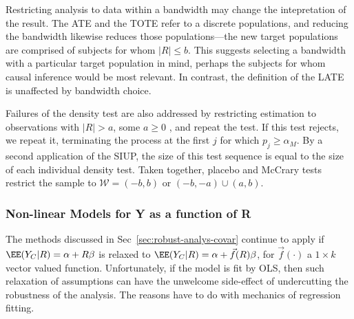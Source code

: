 Restricting analysis to data within a bandwidth may change the
intepretation of the result. The ATE and the
TOTE refer to a discrete populations, and reducing the bandwidth likewise
reduces those populations---the new target populations are comprised of
subjects for whom $|R|\le b$.
This suggests selecting a bandwidth with a particular target
population in mind, perhaps the subjects for whom causal inference
would be most relevant.
In contrast, the definition of the LATE is unaffected by bandwidth
choice.


Failures of the density test are also addressed by restricting
estimation to observations with $|R|>a$, some $a \geq 0$
\citep[e.g.,][]{barrecaetal2011birthweightRDD,eggers2014validity}, and
repeat the test.
If this test rejects, we repeat it, terminating the process at the first $j$ for which
$p_{j} \geq \alpha_{M}$.
By a second application of the SIUP,
the size of this test sequence is equal to the size of each individual
density test.
Taken together, placebo and McCrary tests restrict the sample to
$\mathcal{W} = (-b, b)$ or  $(-b, -a) \cup (a, b)$.

\subsubsection{Non-linear Models for Y as a function of R}\label{sec:nonlinear}
The methods discussed in Sec~\ref{sec:robust-analys-covar} continue to
apply if $\EE (Y_{C}| R) = \alpha + R\beta$ is relaxed to
$\EE (Y_{C}| R) = \alpha + \vec{f}(R)\beta$, for
$\vec{f}(\cdot)$ a $1 \times k$ vector valued function.
Unfortunately, if the model is fit by OLS, then such relaxation of assumptions can have the unwelcome
side-effect of undercutting the robustness of the analysis.  The
reasons have to do with mechanics of regression fitting.

